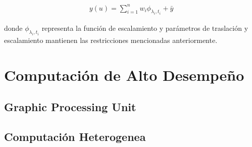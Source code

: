 \begin{eqnarray*}
    y(u) = \sum_{i=1}^{n} w_i\phi_{\lambda_i,t_i} + \bar{y}
\end{eqnarray*}

donde $\phi_{\lambda_i,t_i}$ representa la función de escalamiento y parámetros
de traslación y escalamiento mantienen las restricciones mencionadas
anteriormente.

\section{Computación de Alto Desempeño}
\subsection{Graphic Processing Unit}
\subsection{Computación Heterogenea}
